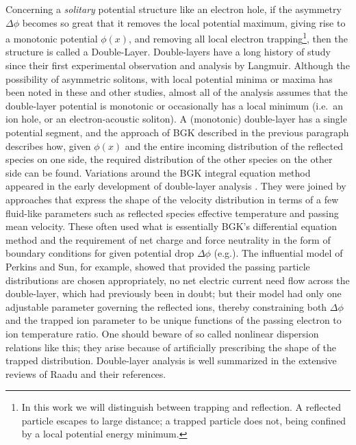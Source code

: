\documentclass[12pt]{article}
\begin{document}
Concerning a \emph{solitary} potential structure like an electron
hole, if the asymmetry $\Delta \phi$ becomes so great that it removes
the local potential maximum, giving rise to a monotonic potential
$\phi(x)$, and removing all local electron trapping\footnote{In this
  work we will distinguish between trapping and reflection. A
  reflected particle escapes to large distance; a trapped particle
  does not, being confined by a local potential energy minimum.}, then
the structure is called a Double-Layer.  Double-layers have a long
history of study since their first experimental observation and
analysis by Langmuir\cite{Langmuir1929}. Although the possibility of
asymmetric solitons, with local potential minima or maxima has been
noted in these and other studies\cite{Schamel1986}, almost all of the
analysis assumes that the double-layer potential is monotonic or
occasionally has a local minimum (i.e.\ an ion hole, or an
electron-acoustic soliton\cite{Vasko2017a}).  A (monotonic)
double-layer has a single potential segment, and the approach of BGK
described in the previous paragraph describes how, given $\phi(x)$ and
the entire incoming distribution of the reflected species on one side,
the required distribution of the other species on the other side can
be found. Variations around the BGK integral equation method appeared
in the early development of double-layer analysis
\cite{Montgomery1969,Knorr1974}. They were joined by approaches that
express the shape of the velocity distribution in terms of a few
fluid-like parameters such as reflected species effective temperature
and passing mean velocity. These often used what is essentially BGK's
differential equation method and the requirement of net charge and
force neutrality in the form of boundary conditions for given
potential drop $\Delta \phi$ (e.g.\cite{Schamel1983}). The influential
model of Perkins and Sun\cite{Perkins1981}, for example, showed that
provided the passing particle distributions are chosen appropriately,
no net electric current need flow across the double-layer, which had
previously been in doubt; but their model had only one adjustable
parameter governing the reflected ions, thereby constraining both
$\Delta \phi$ and the trapped ion parameter to be unique functions of
the passing electron to ion temperature ratio. One should beware of so
called nonlinear dispersion relations like this; they arise because of
artificially prescribing the shape of the trapped distribution.
Double-layer analysis is well summarized in the extensive reviews of
Raadu\cite{Raadu1989,Raadu1988} and their references.
\end{document}
